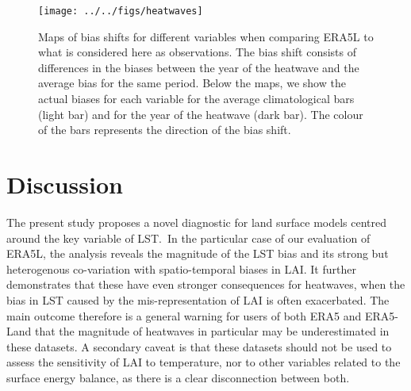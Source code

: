 \documentclass[gmd, manuscript]{copernicus}
\begin{document}
{\par\null{}
\begin{figure}[H]
\begin{center}
\texttt{[image: ../../figs/heatwaves]}
\caption{{Maps of bias shifts for different variables when comparing ERA5L to what
is considered here as observations. The bias shift consists of
differences in the biases between the year of the heatwave and the
average bias for the same period. Below the maps, we show the actual
biases for each variable for the average climatological bars (light bar)
and for the year of the heatwave (dark bar). The colour of the bars
represents the direction of the bias shift.
{\label{116908}}%
}}
\end{center}
\end{figure}







\section{Discussion}

The present study proposes a novel diagnostic for land surface models
centred around the key variable of LST.~In the particular case of our
evaluation of ERA5L, the analysis reveals the magnitude of the LST bias
and its strong but heterogenous co-variation with spatio-temporal biases
in LAI. It further demonstrates that these have even stronger
consequences for heatwaves, when the bias in LST caused by the
mis-representation of LAI is often exacerbated. The main outcome
therefore is a general warning for users of both ERA5 and ERA5-Land that
the magnitude of heatwaves in particular may be underestimated in these
datasets. A secondary caveat is that these datasets should not be used
to assess the sensitivity of LAI to temperature, nor to other variables
related to the surface energy balance, as there is a clear disconnection
between both.

}
\end{document}
